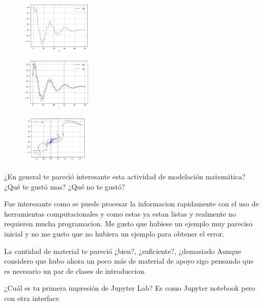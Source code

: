 \documentclass[a4paper]{article}
\begin{document}
\begin{figure}[ht!]
\centering
\includegraphics[width=0.3\textwidth]{2_4_4.png}
\end{figure}

\begin{figure}[ht!]
\centering
\includegraphics[width=0.3\textwidth]{2_4_5.png}
\end{figure}

\begin{figure}[ht!]
\centering
\includegraphics[width=0.3\textwidth]{2_4_6.png}
\end{figure}

    ¿En general te pareció interesante esta actividad de modelación matemática? ¿Qué te gustó mas? ¿Qué no te gustó?
    \linebreak
    
    Fue interesante como se puede procesar la informacion rapidamente con el uso de herramientas computacionales y como estas ya estan listas y realmente no requieren mucha programacion. Me gusto que hubiese un ejemplo muy pareciso inicial y no me gusto que no hubiera un ejemplo para obtener el error.
    \linebreak
    
    La cantidad de material te pareció ¿bien?, ¿suficiente?, ¿demasiado
    \linebreak
    Aunque considero que hubo ahora un poco más de material de apoyo sigo pensando que es necesario un par de clases de introduccion.
    \linebreak
    
    ¿Cuál es tu primera impresión de Jupyter Lab? 
    \linebreak
    Es como Jupyter notebook pero con otra interface
    \linebreak
    
\end{document}
